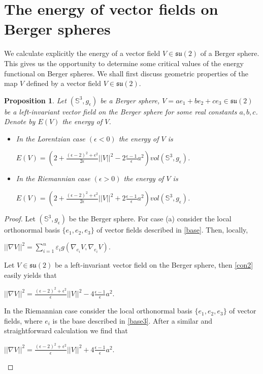\documentclass[11pt,oneside,leqno]{amsart}
\theoremstyle{plain}
\newtheorem{prop}[theorem]{Proposition}
\begin{document}
\section{The energy of vector fields on Berger spheres}
We calculate explicitly the energy of a vector field $V\in{{\mathfrak{su}}}(2)$ of a Berger sphere. This
gives us the opportunity to determine some critical values of the energy functional on Berger spheres. We shall first discuss geometric properties of the map $V$ defined by a
vector field  $V\in{{\mathfrak{su}}}(2)$.
\begin{prop}\label{E1}
Let $({{\mathbb S}}^3, g_{\epsilon})$ be a Berger sphere, $V=ae_1+be_2+ce_3\in {{\mathfrak{su}}}(2)$ be a left-invariant vector field on the Berger sphere for some real constants $a,b,c$. Denote by $E(V)$ the energy of $V$. 
 \begin{itemize}
\item[$(a)$]  In the Lorentzian case $(\epsilon<0)$ the energy of $V$ is
\begin{center}
 $E(V)=(2+\frac{(\epsilon-2)^2+\epsilon^2}{2\epsilon}||V||^2-2\frac{\epsilon-1}{\epsilon} a^2)vol({{\mathbb S}}^3, g_{\epsilon})$.  
\end{center}
\item[$(b)$] In the Riemannian case $(\epsilon>0)$ the energy of $V$ is
\begin{center}
 $E(V)=(2+\frac{(\epsilon-2)^2+\epsilon^2}{2\epsilon}||V||^2+2\frac{\epsilon-1}{\epsilon} a^2)vol({{\mathbb S}}^3, g_{\epsilon})$.  
\end{center}
\end{itemize}
\end{prop}
\begin{proof}
Let $({{\mathbb S}}^3, g_{\epsilon})$ be the Berger sphere. For case (a) consider the local orthonormal
basis $\lbrace e_1,e_2,e_3\rbrace$ of vector fields described in \eqref{base}. Then, locally,
\begin{center}
$||\nabla V||^2=\sum_{i=1}^{n}\varepsilon_i g(\nabla_{e_i}V,\nabla_{e_i}V).$
\end{center}
Let $V \in {{\mathfrak{su}}}(2)$ be a left-invariant vector field on the Berger sphere, then \eqref{con2} easily yields that
\begin{center}
$||\nabla V||^2=\frac{(\epsilon-2)^2+\epsilon^2}{\epsilon}||V||^2-4\frac{\epsilon-1}{\epsilon} a^2.$
\end{center}
In the Riemannian case consider the local orthonormal
basis $\lbrace e_1,e_2,e_3\rbrace$ of vector fields, where $e_i$ is the base described in \eqref{base3}. After a similar and straightforward calculation we find that
\begin{center}
$||\nabla V||^2=\frac{(\epsilon-2)^2+\epsilon^2}{\epsilon}||V||^2+4\frac{\epsilon-1}{\epsilon} a^2.$
\end{center}
\end{proof}
\end{document}
